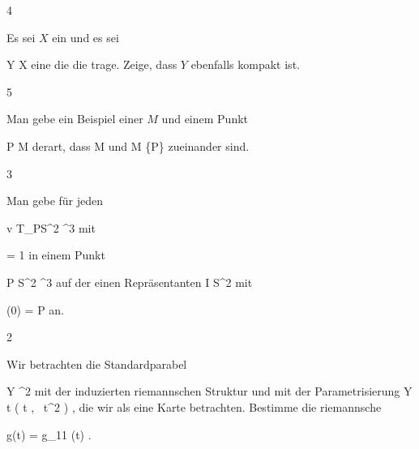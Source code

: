 {4}
{

Es sei $X$ ein
und es sei

\mavergleichskette
{\vergleichskette
{Y
}
{ \subseteq }{ X
}
{  }{
}
{    }{
}
{   }{
}
}
{}{}{}
eine
die die
trage. Zeige, dass $Y$ ebenfalls kompakt ist.

}
{} {}

{5}
{

Man gebe ein Beispiel einer
 
$M$ und einem Punkt

\mavergleichskette
{\vergleichskette
{ P
}
{ \in }{ M
}
{  }{
}
{    }{
}
{   }{
}
}
{}{}{}
derart, dass
\mathkor {} {M} {und} {M \setminus \{P\}} {}
zueinander
sind.

}
{} {}

{3}
{

Man gebe für jeden

\mavergleichskette
{\vergleichskette
{ v
}
{ \in }{ T_PS^2
}
{ \subseteq }{ \R^3
}
{    }{
}
{   }{
}
}
{}{}{}
mit

\mavergleichskette
{\vergleichskette
{  \Vert
}
{ = }{ 1
}
{  }{
}
{    }{
}
{   }{
}
}
{}{}{}
in einem Punkt

\mavergleichskette
{\vergleichskette
{ P
}
{ \in }{ S^2
}
{ \subset }{ \R^3
}
{    }{
}
{   }{
}
}
{}{}{}
auf der
einen
Repräsentanten
\maabbdisp {\gamma} { I } { S^2
} {}
mit

\mavergleichskette
{\vergleichskette
{ \gamma(0)
}
{ = }{ P
}
{  }{
}
{    }{
}
{   }{
}
}
{}{}{}
an.

}
{} {}

{2}
{

Wir betrachten die Standardparabel

\mavergleichskette
{\vergleichskette
{ Y
}
{ \subseteq }{ \R^2
}
{  }{
}
{    }{
}
{   }{
}
}
{}{}{}
mit der induzierten riemannschen Struktur und mit der Parametrisierung
\maabbeledisp {\varphi} {\R} { Y
} { t } { \left(  t   , \,  t^2                   \right)
} {,}
die wir als eine
 {} {}
Karte betrachten. Bestimme die riemannsche

\mavergleichskette
{\vergleichskette
{ g(t)
}
{ = }{ g_{11} (t)
}
{  }{
}
{    }{
}
{   }{
}
}
{}{}{.}

}
{} {}

